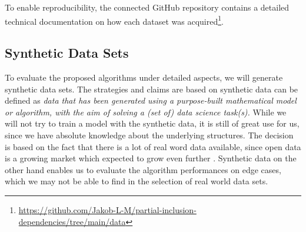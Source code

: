To enable reproducibility, the connected GitHub repository contains a detailed technical documentation on how each dataset was acquired\footnote{\url{https://github.com/Jakob-L-M/partial-inclusion-dependencies/tree/main/data}}.

\subsection{Synthetic Data Sets}
To evaluate the proposed algorithms under detailed aspects, we will generate synthetic data sets. The strategies and claims are based on \cite{jordon2022synthetic} synthetic data can be defined as \textit{data that has been generated using a purpose-built mathematical model or algorithm, with the aim of solving a (set of) data science task(s).} While we will not try to train a model with the synthetic data, it is still of great use for us, since we have absolute knowledge about the underlying structures. The decision is based on the fact that there is a lot of real word data available, since open data is a growing market which expected to grow even further \cite{EUopenData}. Synthetic data on the other hand enables us to evaluate the algorithm performances on edge cases, which we may not be able to find in the selection of real world data sets.

